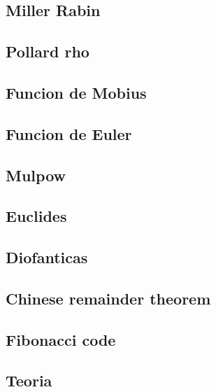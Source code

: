 \subsection{Miller Rabin}
\raggedbottom
\hrulefill
\subsection{Pollard rho}
\raggedbottom
\hrulefill
\subsection{Funcion de Mobius}
\raggedbottom
\hrulefill
\subsection{Funcion de Euler}
\raggedbottom
\hrulefill
\subsection{Mulpow}
\raggedbottom
\hrulefill
\subsection{Euclides}
\raggedbottom
\hrulefill
\subsection{Diofanticas}
\raggedbottom
\hrulefill
\subsection{Chinese remainder theorem}
\raggedbottom
\hrulefill
\subsection{Fibonacci code}
\raggedbottom
\hrulefill
\subsection{Teoria}
\begingroup\setlength{\parindent}{0pt}\setlength{\parskip}{2pt}\par\endgroup
\hrulefill

